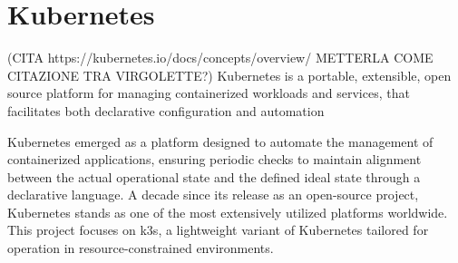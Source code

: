 \chapter{Kubernetes}
(CITA https://kubernetes.io/docs/concepts/overview/  METTERLA COME CITAZIONE TRA VIRGOLETTE?)
Kubernetes is a portable, extensible, open source platform for managing containerized workloads and services, that facilitates both declarative configuration and automation


Kubernetes emerged as a platform designed to automate the management of containerized applications, ensuring periodic checks to maintain alignment between the actual operational state and the defined ideal state through a declarative language. A decade since its release as an open-source project, Kubernetes stands as one of the most extensively utilized platforms worldwide. This project focuses on k3s, a lightweight variant of Kubernetes tailored for operation in resource-constrained environments.

